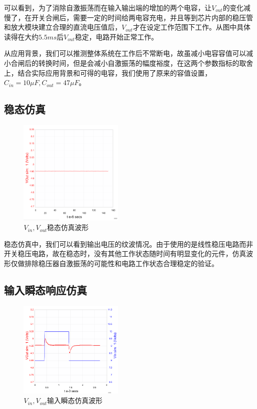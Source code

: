 \documentclass[a4paper, 11pt]{article} %
\begin{document}
可以看到，为了消除自激振荡而在输入输出端的增加的两个电容，让$V_{out}$的变化减慢了，在开关合闸后，需要一定的时间给两电容充电，并且等到芯片内部的稳压管和放大模块建立合理的直流电压值后，$V_{out}$才在设定工作范围下工作。从图中具体读得在大约$5.5ms$后$V_{out}$稳定，电路开始正常工作。

从应用背景，我们可以推测整体系统在工作后不常断电，故虽减小电容容值可以减小合闸后的转换时间，但是会减小自激振荡的幅度裕度，在这两个参数指标的取舍上，结合实际应用背景和可得的电容，我们使用了原来的容值设置，$C_{in} = 10\mu F, C_{out} = 47\mu F$。

\subsection{稳态仿真}

\begin{figure}[H]
    \centering
    \includegraphics[width = 0.45\textwidth]{steady_state_sim.png}
    \caption{$V_{in}, V_{out}$稳态仿真波形}
\end{figure}

稳态仿真中，我们可以看到输出电压的纹波情况。由于使用的是线性稳压电路而非开关稳压电路，故在稳态时，没有其他工作状态随时间有明显变化的元件，仿真波形仅做排除稳压器自激振荡的可能性和电路工作状态合理稳定的验证。

\subsection{输入瞬态响应仿真}

\begin{figure}[H]
    \centering
    \includegraphics[width = 0.45\textwidth]{input_transient.png}
    \caption{$V_{in}, V_{out}$输入瞬态仿真波形}
\end{figure}
\end{document}
